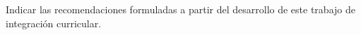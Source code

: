 Indicar las recomendaciones formuladas a partir del desarrollo de este trabajo de integración curricular.